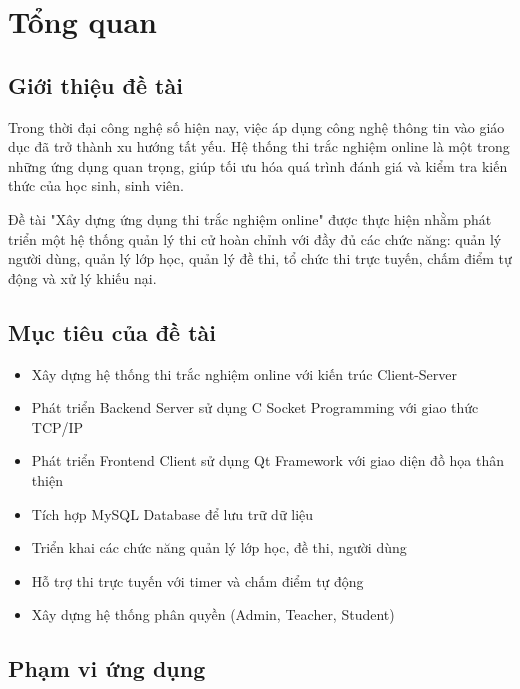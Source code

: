 ﻿\documentclass[12pt,a4paper]{report}
\begin{document}
\newpage
\thispagestyle{empty}
\mbox{}

\tableofcontents
\newpage
\listoffigures
\newpage
\listoftables

\chapter{Tổng quan}

\section{Giới thiệu đề tài}

Trong thời đại công nghệ số hiện nay, việc áp dụng công nghệ thông tin vào giáo dục đã trở thành xu hướng tất yếu. Hệ thống thi trắc nghiệm online là một trong những ứng dụng quan trọng, giúp tối ưu hóa quá trình đánh giá và kiểm tra kiến thức của học sinh, sinh viên.

Đề tài "Xây dựng ứng dụng thi trắc nghiệm online" được thực hiện nhằm phát triển một hệ thống quản lý thi cử hoàn chỉnh với đầy đủ các chức năng: quản lý người dùng, quản lý lớp học, quản lý đề thi, tổ chức thi trực tuyến, chấm điểm tự động và xử lý khiếu nại.

\section{Mục tiêu của đề tài}

\begin{itemize}
    \item Xây dựng hệ thống thi trắc nghiệm online với kiến trúc Client-Server
    \item Phát triển Backend Server sử dụng C Socket Programming với giao thức TCP/IP
    \item Phát triển Frontend Client sử dụng Qt Framework với giao diện đồ họa thân thiện
    \item Tích hợp MySQL Database để lưu trữ dữ liệu
    \item Triển khai các chức năng quản lý lớp học, đề thi, người dùng
    \item Hỗ trợ thi trực tuyến với timer và chấm điểm tự động
    \item Xây dựng hệ thống phân quyền (Admin, Teacher, Student)
\end{itemize}

\section{Phạm vi ứng dụng}
\end{document}
